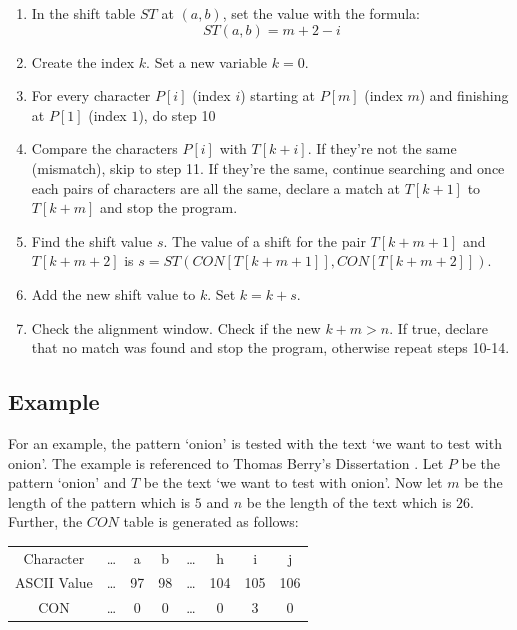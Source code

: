 \begin{enumerate}
	\item In the shift table $ST$ at $(a, b)$, set the value with the formula: $$ ST(a,b) = m+2-i $$

\item Create the index $k$. Set a new variable $k=0$.

\item For every character $P[i]$ (index $i$) starting at $P[m]$ (index $m$) and finishing at $P[1]$ (index $1$), do step 10 
	
	\item Compare the characters $P[i]$ with $T[k + i]$. If they're not the same (mismatch), skip to step 11. If they're the same, continue searching and once each pairs of characters are all the same, declare a match at $T[k+1]$ to $T[k+m]$ and stop the program.

\item Find the shift value $s$. The value of a shift for the pair $T [k +m+ 1]$ and $T [k +m+ 2]$ is $s = ST (CON[T[k + m+ 1]], CON[ T [k +m+ 2]])$. 
	
\item Add the new shift value to $k$. Set $k=k+s$.

\item Check the alignment window. Check if the new $k+m > n$. If true, declare that no match was found and stop the program, otherwise repeat steps 10-14. 

\end{enumerate}
\subsection{Example}
For an example, the pattern `onion' is tested with the text `we want to test with onion'. The example is referenced to Thomas Berry's Dissertation \cite{berry}. 
Let $P$ be the pattern `onion' and $T$ be the text `we want to test with onion'. Now let $m$ be the length of the pattern which is $5$ and $n$ be the length of the text which is $26$. Further, the $CON$ table is generated as follows:

\begin{center}
\begin{tabular}{ c c c c c c c c }
 Character & \ldots & a & b & \ldots & h & i & j \\ 
 ASCII Value & \ldots & 97 & 98 & \ldots & 104 & 105 & 106 \\  
 CON & \ldots & 0 & 0 & \ldots & 0 & 3 & 0    
\end{tabular}
\end{center}

